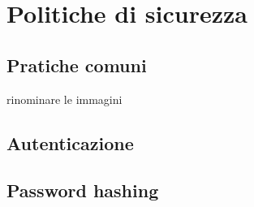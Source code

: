 \section{Politiche di sicurezza}
\subsection{Pratiche comuni}
rinominare le immagini
\subsection{Autenticazione}
\subsection{Password hashing}